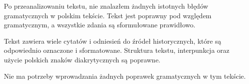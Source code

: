 Po przeanalizowaniu tekstu, nie znalazłem żadnych istotnych błędów gramatycznych w polskim tekście. Tekst jest poprawny pod względem gramatycznym, a wszystkie zdania są sformułowane prawidłowo.

Tekst zawiera wiele cytatów i odniesień do źródeł historycznych, które są odpowiednio oznaczone i sformatowane. Struktura tekstu, interpunkcja oraz użycie polskich znaków diakrytycznych są poprawne.

Nie ma potrzeby wprowadzania żadnych poprawek gramatycznych w tym tekście.